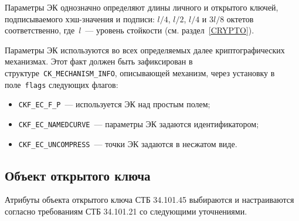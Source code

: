 Параметры ЭК однозначно определяют длины личного и открытого ключей, 
подписываемого хэш-значения и подписи: $l/4$, $l/2$, $l/4$ и $3l/8$ 
октетов соответственно, где~$l$~--- уровень стойкости (см. 
раздел~\ref{CRYPTO}).

Параметры ЭК используются во всех определяемых далее криптографических 
механизмах. Этот факт должен быть зафиксирован в 
структуре~\verb|CK_MECHANISM_INFO|, описывающей механизм,  
через установку в поле~\texttt{flags} следующих флагов:
\begin{itemize}
\item
\verb|CKF_EC_F_P|~--- используется ЭК над простым полем;
\item
\verb|CKF_EC_NAMEDCURVE|~--- параметры ЭК задаются идентификатором;
\item
\verb|CKF_EC_UNCOMPRESS|~--- точки ЭК задаются в несжатом виде.
\end{itemize}

\subsection{Объект открытого ключа}\label{CRYPTOKI.Pubkey}

Атрибуты объекта открытого ключа СТБ 34.101.45 
выбираются и настраиваются согласно требованиям СТБ 34.101.21 
со следующими уточнениями.

